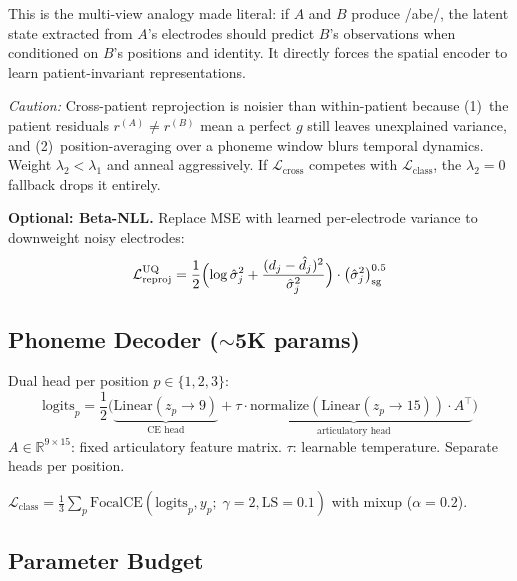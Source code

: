 \documentclass[11pt,letterpaper]{article}
\newcommand{\R}{\mathbb{R}}
\begin{document}
This is the multi-view analogy made literal: if $A$ and $B$ produce /abe/, the latent state extracted from $A$'s electrodes should predict $B$'s observations when conditioned on $B$'s positions and identity. It directly forces the spatial encoder to learn patient-invariant representations.

\textcolor{BrickRed}{\textit{Caution:} Cross-patient reprojection is noisier than within-patient because (1)~the patient residuals $r^{(A)} \neq r^{(B)}$ mean a perfect $g$ still leaves unexplained variance, and (2)~position-averaging over a phoneme window blurs temporal dynamics. Weight $\lambda_2 < \lambda_1$ and anneal aggressively. If $\mathcal{L}_{\text{cross}}$ competes with $\mathcal{L}_{\text{class}}$, the $\lambda_2{=}0$ fallback drops it entirely.}

\textbf{Optional: Beta-NLL.} Replace MSE with learned per-electrode variance to downweight noisy electrodes:
\begin{equation}
\mathcal{L}_{\text{reproj}}^{\text{UQ}} = \frac{1}{2}\Bigl(\log \hat{\sigma}_j^2 + \frac{(d_j - \hat{d}_j)^2}{\hat{\sigma}_j^2}\Bigr) \cdot \bigl(\hat{\sigma}_j^2\bigr)^{0.5}_{\text{sg}}
\end{equation}


\subsection{Phoneme Decoder (${\sim}$5K params)}

Dual head per position $p \in \{1,2,3\}$:
\begin{equation}
\text{logits}_p = \frac{1}{2}\bigl(\underbrace{\text{Linear}(z_p \to 9)}_{\text{CE head}} + \underbrace{\tau \cdot \text{normalize}(\text{Linear}(z_p \to 15)) \cdot A^\top}_{\text{articulatory head}}\bigr)
\end{equation}
$A \in \R^{9 \times 15}$: fixed articulatory feature matrix. $\tau$: learnable temperature. Separate heads per position.

$\mathcal{L}_{\text{class}} = \frac{1}{3}\sum_{p} \text{FocalCE}(\text{logits}_p, y_p;\; \gamma{=}2, \text{LS}{=}0.1)$ with mixup ($\alpha{=}0.2$).


\subsection{Parameter Budget}
\end{document}
